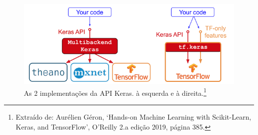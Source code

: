 \begin{figure}[htb]
\centering
\includegraphics[width=12cm]{figuras/tensor_flow}
\caption{As 2 implementações da API Keras.  à esquerda e  à direita.\footnote{Extraído de: Aurélien Géron, `Hands-on Machine Learning with Scikit-Learn, Keras, and TensorFlow', O'Reilly 2.a edição 2019, página 385.}}
\label{fig:tensor_flow}
\end{figure}

